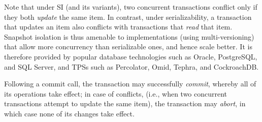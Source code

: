 Note that under SI (and its variants), two concurrent transactions conflict only if they both \emph{update} the same item.  
In contrast, under serializability, a transaction that updates an item also conflicts with transactions that \emph{read} that item. 
Snapshot isolation is thus amenable to implementations (using multi-versioning) that 
allow more concurrency than serializable ones, and hence scale better.
It is therefore provided by popular database technologies such as Oracle, PostgreSQL, and SQL Server,
and TPSs such as Percolator, Omid, Tephra, and  CockroachDB.

Following a commit call, the transaction may successfully \emph{commit}, whereby all of its operations take effect;
in case of conflicts, (i.e., when two concurrent transactions attempt to update the same item), the transaction may
\emph{abort}, in which case none of its changes take effect. 






